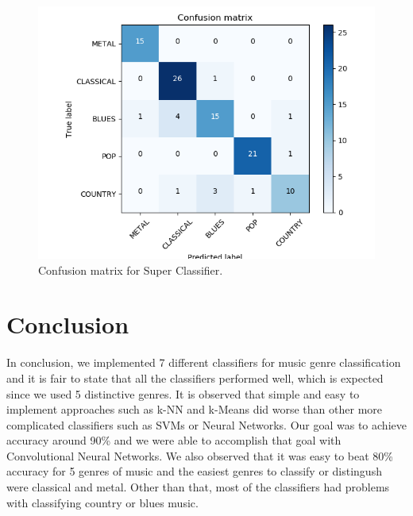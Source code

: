 \begin{figure}
\begin{center}
\includegraphics[scale=0.2]{./figures/confusion_sc.png}
\end{center}
\caption
{
Confusion matrix for Super Classifier.
}
\label{fig:big_picture5}
\end{figure}

\section{Conclusion}\label{sec:conclusion}
In conclusion, we implemented 7 different classifiers for music genre classification and it is fair to state that all the classifiers performed well, which is expected since we used 5 distinctive genres. It is observed that simple and easy to implement approaches such as k-NN and k-Means did worse than other more complicated classifiers such as SVMs or Neural Networks. Our goal was to achieve accuracy around 90\% and we were able to accomplish that goal with Convolutional Neural Networks. We also observed that it was easy to beat 80\% accuracy for 5 genres of music and the easiest genres to classify or distingush were classical and metal. Other than that, most of the classifiers had problems with classifying country or blues music.

